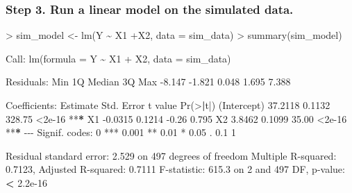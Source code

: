 \documentclass[
]{article}
\newenvironment{Shaded}{\begin{snugshade}}{\end{snugshade}}
\newcommand{\AttributeTok}[1]{\textcolor[rgb]{0.77,0.63,0.00}{#1}}
\newcommand{\DecValTok}[1]{\textcolor[rgb]{0.00,0.00,0.81}{#1}}
\newcommand{\ErrorTok}[1]{\textcolor[rgb]{0.64,0.00,0.00}{\textbf{#1}}}
\newcommand{\FloatTok}[1]{\textcolor[rgb]{0.00,0.00,0.81}{#1}}
\newcommand{\FunctionTok}[1]{\textcolor[rgb]{0.00,0.00,0.00}{#1}}
\newcommand{\NormalTok}[1]{#1}
\newcommand{\OtherTok}[1]{\textcolor[rgb]{0.56,0.35,0.01}{#1}}
\newcommand{\SpecialCharTok}[1]{\textcolor[rgb]{0.00,0.00,0.00}{#1}}
\newcommand{\StringTok}[1]{\textcolor[rgb]{0.31,0.60,0.02}{#1}}
\begin{document}
\hypertarget{step-3.-run-a-linear-model-on-the-simulated-data.}{%
\subsubsection{Step 3. Run a linear model on the simulated
data.}\label{step-3.-run-a-linear-model-on-the-simulated-data.}}

\begin{Shaded}
\begin{Highlighting}[]
\SpecialCharTok{\textgreater{}}\NormalTok{ sim\_model }\OtherTok{\textless{}{-}} \FunctionTok{lm}\NormalTok{(Y }\SpecialCharTok{\textasciitilde{}}\NormalTok{ X1 }\SpecialCharTok{+}\NormalTok{X2, }\AttributeTok{data =}\NormalTok{ sim\_data)}
\SpecialCharTok{\textgreater{}} \FunctionTok{summary}\NormalTok{(sim\_model)}

\NormalTok{Call}\SpecialCharTok{:}
\FunctionTok{lm}\NormalTok{(}\AttributeTok{formula =}\NormalTok{ Y }\SpecialCharTok{\textasciitilde{}}\NormalTok{ X1 }\SpecialCharTok{+}\NormalTok{ X2, }\AttributeTok{data =}\NormalTok{ sim\_data)}

\NormalTok{Residuals}\SpecialCharTok{:}
\NormalTok{   Min     1Q Median     3Q    Max }
\SpecialCharTok{{-}}\FloatTok{8.147} \SpecialCharTok{{-}}\FloatTok{1.821}  \FloatTok{0.048}  \FloatTok{1.695}  \FloatTok{7.388} 

\NormalTok{Coefficients}\SpecialCharTok{:}
\NormalTok{            Estimate Std. Error t value }\FunctionTok{Pr}\NormalTok{(}\SpecialCharTok{\textgreater{}}\ErrorTok{|}\NormalTok{t}\SpecialCharTok{|}\NormalTok{)    }
\NormalTok{(Intercept)  }\FloatTok{37.2118}     \FloatTok{0.1132}  \FloatTok{328.75}   \SpecialCharTok{\textless{}}\FloatTok{2e{-}16} \SpecialCharTok{**}\ErrorTok{*}
\NormalTok{X1           }\SpecialCharTok{{-}}\FloatTok{0.0315}     \FloatTok{0.1214}   \SpecialCharTok{{-}}\FloatTok{0.26}    \FloatTok{0.795}    
\NormalTok{X2            }\FloatTok{3.8462}     \FloatTok{0.1099}   \FloatTok{35.00}   \SpecialCharTok{\textless{}}\FloatTok{2e{-}16} \SpecialCharTok{**}\ErrorTok{*}
\SpecialCharTok{{-}{-}{-}}
\NormalTok{Signif. codes}\SpecialCharTok{:}  \DecValTok{0} \StringTok{\textquotesingle{}***\textquotesingle{}} \FloatTok{0.001} \StringTok{\textquotesingle{}**\textquotesingle{}} \FloatTok{0.01} \StringTok{\textquotesingle{}*\textquotesingle{}} \FloatTok{0.05} \StringTok{\textquotesingle{}.\textquotesingle{}} \FloatTok{0.1} \StringTok{\textquotesingle{} \textquotesingle{}} \DecValTok{1}

\NormalTok{Residual standard error}\SpecialCharTok{:} \FloatTok{2.529}\NormalTok{ on }\DecValTok{497}\NormalTok{ degrees of freedom}
\NormalTok{Multiple R}\SpecialCharTok{{-}}\NormalTok{squared}\SpecialCharTok{:}  \FloatTok{0.7123}\NormalTok{,    Adjusted R}\SpecialCharTok{{-}}\NormalTok{squared}\SpecialCharTok{:}  \FloatTok{0.7111} 
\NormalTok{F}\SpecialCharTok{{-}}\NormalTok{statistic}\SpecialCharTok{:} \FloatTok{615.3}\NormalTok{ on }\DecValTok{2}\NormalTok{ and }\DecValTok{497}\NormalTok{ DF,  p}\SpecialCharTok{{-}}\NormalTok{value}\SpecialCharTok{:} \ErrorTok{\textless{}} \FloatTok{2.2e{-}16}
\end{Highlighting}
\end{Shaded}
\end{document}
